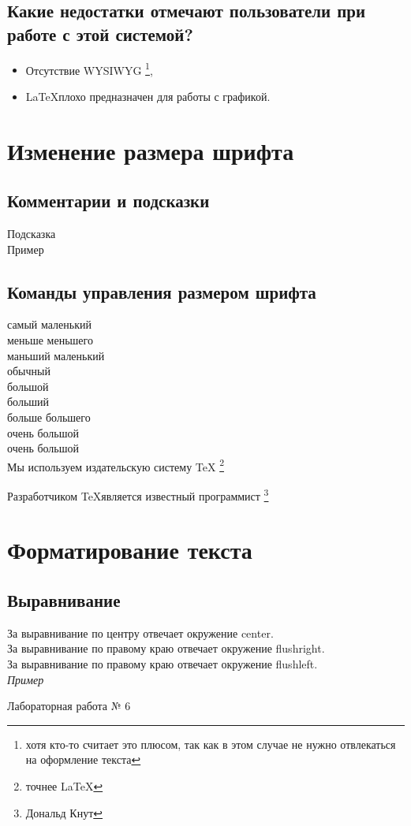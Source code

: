 \documentclass[a4paper,12pt]{article} %
\begin{document}
\subsection{Какие недостатки отмечают пользователи при работе с этой системой?}
\begin{itemize}
\item Отсутствие WYSIWYG
\footnote{хотя кто-то считает это плюсом, так как в этом случае не нужно отвлекаться на оформление текста},
\item \LaTeX плохо предназначен для работы с графикой.
\end{itemize}
\newpage
\section{Изменение размера шрифта}
\subsection{Комментарии и подсказки}
\scriptsize Подсказка\\
\Large Пример\\
\subsection*{Команды управления размером шрифта}
\tiny самый маленький\\
\scriptsize меньше меньшего\\
\footnotesize маньший
\small маленький\\
\normalsize обычный\\
\large большой\\
\Large больший\\
\LARGE больше большего\\
\huge очень большой\\
\Huge очень большой\\

\normalsize
Мы используем издательскую систему \TeX
\footnote{точнее \LaTeX}

Разработчиком \TeX является известный программист
\footnote{Дональд Кнут} 

\section{Форматирование текста}
\subsection{Выравнивание}
За выравнивание по центру отвечает окружение center.\\
За выравнивание по правому краю отвечает окружение flushright.\\
За выравнивание по правому краю отвечает окружение flushleft.\\
\textit{Пример}
\begin{center}
Лабораторная работа № 6
\end{center}
\end{document}
